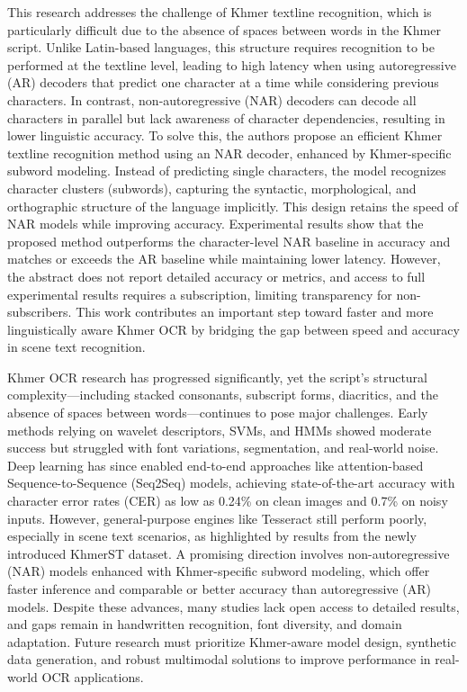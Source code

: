\citet{Rina2025} This research addresses the challenge of Khmer textline recognition, 
which is particularly difficult due to the absence of spaces between words in the Khmer script. 
Unlike Latin-based languages, this structure requires recognition to be performed at the textline level, 
leading to high latency when using autoregressive (AR) decoders that predict one character at a 
time while considering previous characters. In contrast, non-autoregressive (NAR) decoders can decode 
all characters in parallel but lack awareness of character dependencies, resulting in lower linguistic 
accuracy. To solve this, the authors propose an efficient Khmer textline recognition method using an NAR 
decoder, enhanced by Khmer-specific subword modeling. Instead of predicting single characters, the model 
recognizes character clusters (subwords), capturing the syntactic, morphological, and orthographic 
structure of the language implicitly. This design retains the speed of NAR models while improving accuracy. 
Experimental results show that the proposed method outperforms the character-level NAR baseline 
in accuracy and matches or exceeds the AR baseline while maintaining lower latency. However, 
the abstract does not report detailed accuracy or metrics, and access to full experimental results 
requires a subscription, limiting transparency for non-subscribers. This work contributes an 
important step toward faster and more linguistically aware Khmer OCR by bridging the gap between 
speed and accuracy in scene text recognition.

Khmer OCR research has progressed significantly, yet the script’s structural complexity—including 
stacked consonants, subscript forms, diacritics, and the absence of spaces between words—continues 
to pose major challenges. Early methods relying on wavelet descriptors, SVMs, and HMMs showed moderate 
success but struggled with font variations, segmentation, and real-world noise. Deep learning has 
since enabled end-to-end approaches like attention-based Sequence-to-Sequence (Seq2Seq) models, 
achieving state-of-the-art accuracy with character error rates (CER) as low as 0.24\% on clean 
images and 0.7\% on noisy inputs. However, general-purpose engines like Tesseract still perform 
poorly, especially in scene text scenarios, as highlighted by results from the newly introduced 
KhmerST dataset. A promising direction involves non-autoregressive (NAR) models enhanced with 
Khmer-specific subword modeling, which offer faster inference and comparable or better accuracy 
than autoregressive (AR) models. Despite these advances, many studies lack open access to detailed 
results, and gaps remain in handwritten recognition, font diversity, and domain adaptation. 
Future research must prioritize Khmer-aware model design, synthetic data generation, and robust 
multimodal solutions to improve performance in real-world OCR applications.
    

